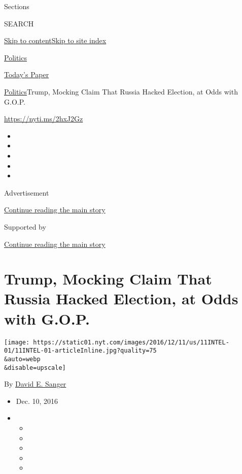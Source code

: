 Sections

SEARCH

\protect\hyperlink{site-content}{Skip to
content}\protect\hyperlink{site-index}{Skip to site index}

\href{https://www.nytimes.com/section/politics}{Politics}

\href{https://myaccount.nytimes.com/auth/login?response_type=cookie\&client_id=vi}{}

\href{https://www.nytimes.com/section/todayspaper}{Today's Paper}

\href{/section/politics}{Politics}\textbar{}Trump, Mocking Claim That
Russia Hacked Election, at Odds with G.O.P.

\url{https://nyti.ms/2hxJ2Gz}

\begin{itemize}
\item
\item
\item
\item
\item
\end{itemize}

Advertisement

\protect\hyperlink{after-top}{Continue reading the main story}

Supported by

\protect\hyperlink{after-sponsor}{Continue reading the main story}

\hypertarget{trump-mocking-claim-that-russia-hacked-election-at-odds-with-gop}{%
\section{Trump, Mocking Claim That Russia Hacked Election, at Odds with
G.O.P.}\label{trump-mocking-claim-that-russia-hacked-election-at-odds-with-gop}}

\texttt{[image: https://static01.nyt.com/images/2016/12/11/us/11INTEL-01/11INTEL-01-articleInline.jpg?quality=75\\\&auto=webp\\\&disable=upscale]}

By \href{http://www.nytimes.com/by/david-e-sanger}{David E. Sanger}

\begin{itemize}
\item
  Dec. 10, 2016
\item
  \begin{itemize}
  \item
  \item
  \item
  \item
  \item
  \end{itemize}
\end{itemize}

